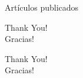 \documentclass[aspectratio=169,compress]{beamer}
\begin{document}
\renewcommand*{\bibfont}{\tiny}
\begin{frame}[allowframebreaks]{Artículos publicados}
    \printbibliography[title=Artículos publicados,keyword=primary]
\end{frame}

\begin{frame}%
\begin{center}
\Huge Thank You! \\
\Huge Gracias! \\
\end{center}
\end{frame}

\begin{frame}%
\begin{center}
{\fontsize{40}{50}\selectfont Thank You!}\\
{\fontsize{40}{50}\selectfont Gracias!}
\end{center}
\end{frame}
\end{document}

